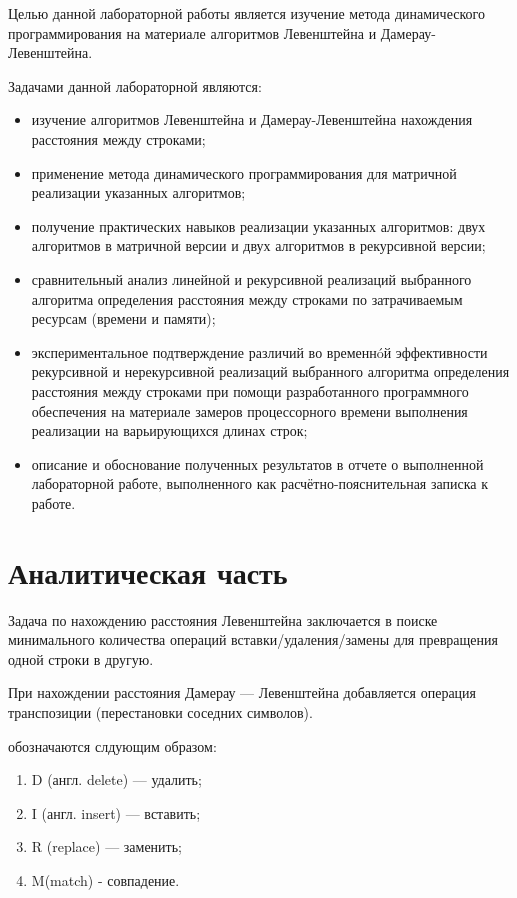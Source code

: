\documentclass[12pt]{report}
\begin{document}
Целью данной лабораторной работы является изучение метода динамического программирования на материале алгоритмов
Левенштейна и Дамерау-Левенштейна. 

Задачами данной лабораторной являются:
\begin{itemize}
  	\item изучение алгоритмов Левенштейна и Дамерау-Левенштейна нахождения расстояния между строками;
	\item применение метода динамического программирования для матричной реализации указанных алгоритмов; 
	\item получение практических навыков реализации указанных алгоритмов: двух алгоритмов в матричной версии и двух алгоритмов в рекурсивной версии; 
	\item сравнительный анализ линейной и рекурсивной реализаций выбранного алгоритма определения расстояния между строками по затрачиваемым ресурсам (времени и памяти); 
	\item экспериментальное подтверждение различий во временнóй эффективности рекурсивной и
нерекурсивной реализаций выбранного алгоритма определения расстояния между строками при
помощи разработанного программного обеспечения на материале замеров процессорного времени
выполнения реализации на варьирующихся длинах строк; 
	\item описание и обоснование полученных результатов в отчете о выполненной лабораторной работе, выполненного как расчётно-пояснительная записка к работе. 
\end{itemize}


\chapter{Аналитическая часть}
Задача по нахождению расстояния Левенштейна заключается в поиске минимального количества операций вставки/удаления/замены для превращения одной строки в другую.

При нахождении расстояния Дамерау — Левенштейна добавляется операция транспозиции (перестановки соседних символов).  
 
 обозначаются слдующим образом: 
\begin{enumerate}
  	\item D (англ. delete) — удалить;
	\item I (англ. insert) — вставить;
	\item R (replace) — заменить;
	\item M(match) - совпадение.
\end{enumerate}
\end{document}
